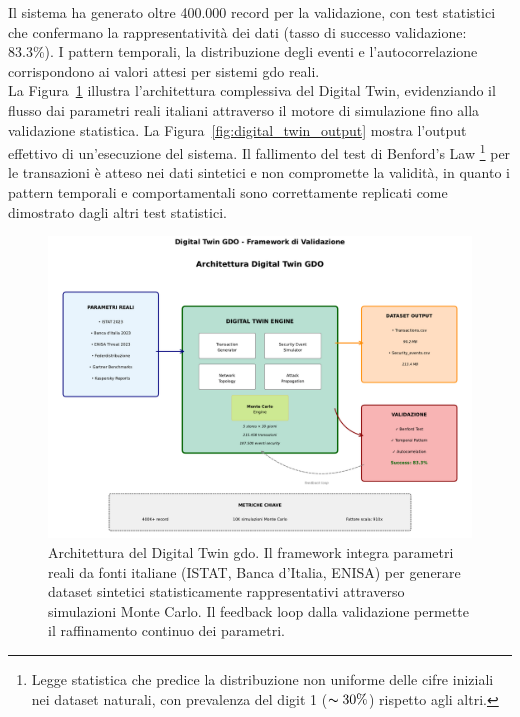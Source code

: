 Il sistema ha generato oltre 400.000 record per la validazione, 
con test statistici che confermano la rappresentatività dei dati 
(tasso di successo validazione: 83.3\%). I pattern temporali, 
la distribuzione degli eventi e l'autocorrelazione corrispondono 
ai valori attesi per sistemi \gls{gdo} reali.\\
La Figura~\ref{fig:digital_twin_architecture} illustra l'architettura 
complessiva del Digital Twin, evidenziando il flusso dai parametri reali 
italiani attraverso il motore di simulazione fino alla validazione statistica. 
La Figura~\ref{fig:digital_twin_output} mostra l'output effettivo di 
un'esecuzione del sistema.
Il fallimento del test di Benford's Law \footnote{Legge statistica che predice 
la distribuzione non uniforme delle cifre iniziali nei dataset naturali, con 
prevalenza del digit 1 ($\thicksim 30\%$) rispetto agli altri.} per le transazioni è atteso nei 
dati sintetici e non compromette la validità, in quanto i pattern temporali e comportamentali sono correttamente replicati come dimostrato dagli altri test statistici.

\begin{figure}[H]
\centering
\includegraphics[width=\textwidth]{thesis_figures/cap2/digital_twin_architecture.pdf}
\caption{Architettura del Digital Twin \gls{gdo}. Il framework integra parametri 
reali da fonti italiane (ISTAT, Banca d'Italia, ENISA) per generare dataset 
sintetici statisticamente rappresentativi attraverso simulazioni Monte Carlo. 
Il feedback loop dalla validazione permette il raffinamento continuo dei parametri.}
\label{fig:digital_twin_architecture}
\end{figure}


